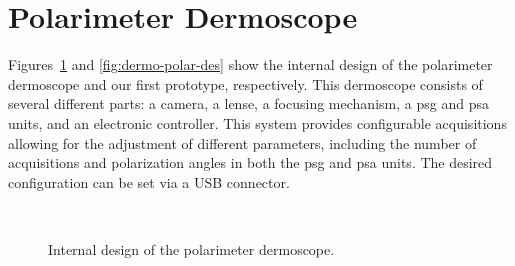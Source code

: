 \section{Polarimeter Dermoscope}
\label{sec:chp5-sec2}
Figures~\ref{fig:internal-des} and \ref{fig:dermo-polar-des} show the internal design of the polarimeter dermoscope and our first prototype, respectively.
This dermoscope consists of several different parts: a camera, a lense, a focusing mechanism, a \ac{psg} and \ac{psa} units, and an electronic controller.
This system provides configurable acquisitions allowing for the adjustment of different parameters, including the number of acquisitions and polarization angles in both the \ac{psg} and \ac{psa} units.
The desired configuration can be set via a USB connector.

\begin{figure}
	\begin{center}
		\\		
	\end{center}
	\caption[Internal design of polarimeter dermoscope]{Internal design of the polarimeter dermoscope.}
	\label{fig:internal-des}
\end{figure}

